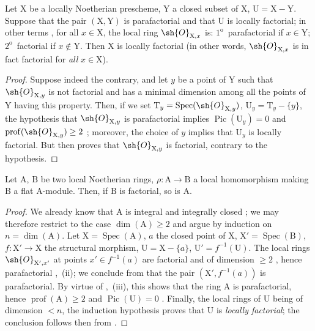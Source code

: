 \begin{corollary}[21.13.11]
\label{IV.21.13.11}
Let $\mathrm{X}$ be a locally Noetherian prescheme, $\mathrm{Y}$ a closed subset of $\mathrm{X}$, $\mathrm{U}=\mathrm{X}-\mathrm{Y}$.
Suppose that the pair $(\mathrm{X},\mathrm{Y})$ is parafactorial and that $\mathrm{U}$ is locally factorial; in other terms , for all $x\in\mathrm{X}$, the local ring $\sh{O}_{\mathrm{X},x}$ is:
$1^{\mathrm{o}}$~parafactorial if $x\in\mathrm{Y}$;
$2^{\mathrm{o}}$~factorial if $x\notin\mathrm{Y}$.
Then $\mathrm{X}$ is locally factorial (in other words, $\sh{O}_{\mathrm{X},x}$ is in fact factorial for \emph{all} $x\in\mathrm{X}$).
\end{corollary}

\begin{proof}
Suppose indeed the contrary, and let $y$ be a point of $\mathrm{Y}$ such that $\sh{O}_{\mathrm{X},y}$ is not factorial and has a minimal dimension among all the points of $\mathrm{Y}$ having this property.
Then, if we set $\mathrm{T}_y=\operatorname{Spec}(\sh{O}_{\mathrm{X},y})$, $\mathrm{U}_y=\mathrm{T}_y-\{y\}$, the hypothesis that $\sh{O}_{\mathrm{X},y}$ is parafactorial implies $\operatorname{Pic}(\mathrm{U}_y)=0$ and $\operatorname{prof}(\sh{O}_{\mathrm{X},y})\geq 2$ ; moreover, the choice of $y$ implies that $\mathrm{U}_y$ is locally factorial.
But then  proves that $\sh{O}_{\mathrm{X},y}$ is factorial, contrary to the hypothesis.
\end{proof}

\begin{proposition}[21.13.12]
\label{IV.21.13.12}
Let $\mathrm{A}$, $\mathrm{B}$ be two local Noetherian rings, $\rho:\mathrm{A}\to\mathrm{B}$ a local homomorphism making $\mathrm{B}$ a flat A-module.
Then, if $\mathrm{B}$ is factorial, so is $\mathrm{A}$.
\end{proposition}

\begin{proof}
We already know that $\mathrm{A}$ is integral and integrally closed ; we may therefore restrict to the case $\dim(\mathrm{A})\geq 2$ and argue by induction on $n=\dim(\mathrm{A})$.
Let $\mathrm{X}=\operatorname{Spec}(\mathrm{A})$, $a$ the closed point of $\mathrm{X}$, $\mathrm{X}'=\operatorname{Spec}(\mathrm{B})$, $f:\mathrm{X}'\to\mathrm{X}$ the structural morphism, $\mathrm{U}=\mathrm{X}-\{a\}$, $\mathrm{U}'=f^{-1}(\mathrm{U})$.
The local rings $\sh{O}_{\mathrm{X}',x'}$ at points $x'\in f^{-1}(a)$ are factorial and of dimension $\geq 2$ , hence parafactorial ,~(ii); we conclude from  that the pair $(\mathrm{X}',f^{-1}(a))$ is parafactorial.
By virtue of ,~(iii), this shows that the ring $\mathrm{A}$ is parafactorial, hence $\operatorname{prof}(\mathrm{A})\geq 2$ and $\operatorname{Pic}(\mathrm{U})=0$ .
Finally, the local rings of $\mathrm{U}$ being of dimension $<n$, the induction hypothesis proves that $\mathrm{U}$ is \emph{locally factorial}; the conclusion follows then from .
\end{proof}

